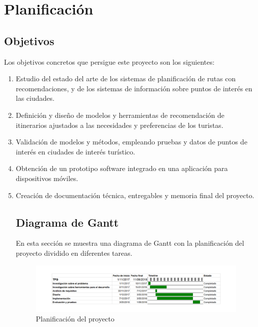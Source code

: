 \chapter{Planificación}
\section[Objectivos]{Objetivos}
Los objetivos concretos que persigue este proyecto son los siguientes:
\begin{enumerate}
	\item Estudio del estado del arte de los sistemas de planificación de rutas con recomendaciones, y de los sistemas de información sobre puntos de interés en las ciudades.
	\item Definición y diseño de modelos y herramientas de recomendación de itinerarios ajustados a las necesidades y preferencias de los turistas.
	\item Validación de modelos y métodos, empleando pruebas y datos de puntos de interés en ciudades de interés turístico.
	\item Obtención de un prototipo software integrado en una aplicación para dispositivos móviles.
	\item Creación de documentación técnica, entregables y memoria final del proyecto.

\section[Diagrama de Gantt]{Diagrama de Gantt}
En esta sección se muestra una diagrama de Gantt con la planificación del proyecto dividido en diferentes tareas.\newline
\begin{figure}[H]
	\centering
	\includegraphics[scale=0.4]{imagenes/Gantt.png}
	\caption{Planificación del proyecto}
	\label{fig:gantt}
\end{figure}
	
\end{enumerate}

